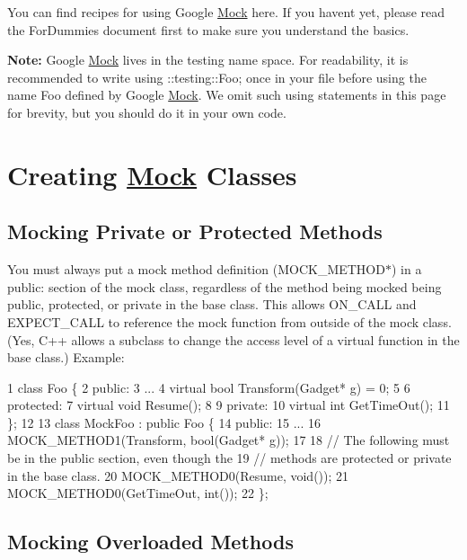 You can find recipes for using Google \hyperlink{class_mock}{Mock} here. If you haven\textquotesingle{}t yet, please read the For\+Dummies document first to make sure you understand the basics.

{\bfseries Note\+:} Google \hyperlink{class_mock}{Mock} lives in the {\ttfamily testing} name space. For readability, it is recommended to write {\ttfamily using \+::testing\+::\+Foo;} once in your file before using the name {\ttfamily Foo} defined by Google \hyperlink{class_mock}{Mock}. We omit such {\ttfamily using} statements in this page for brevity, but you should do it in your own code.

\section*{Creating \hyperlink{class_mock}{Mock} Classes}

\subsection*{Mocking Private or Protected Methods}

You must always put a mock method definition ({\ttfamily M\+O\+C\+K\+\_\+\+M\+E\+T\+H\+O\+D$\ast$}) in a {\ttfamily public\+:} section of the mock class, regardless of the method being mocked being {\ttfamily public}, {\ttfamily protected}, or {\ttfamily private} in the base class. This allows {\ttfamily O\+N\+\_\+\+C\+A\+LL} and {\ttfamily E\+X\+P\+E\+C\+T\+\_\+\+C\+A\+LL} to reference the mock function from outside of the mock class. (Yes, C++ allows a subclass to change the access level of a virtual function in the base class.) Example\+:


\begin{DoxyCode}
1 class Foo \{
2  public:
3   ...
4   virtual bool Transform(Gadget* g) = 0;
5 
6  protected:
7   virtual void Resume();
8 
9  private:
10   virtual int GetTimeOut();
11 \};
12 
13 class MockFoo : public Foo \{
14  public:
15   ...
16   MOCK\_METHOD1(Transform, bool(Gadget* g));
17 
18   // The following must be in the public section, even though the
19   // methods are protected or private in the base class.
20   MOCK\_METHOD0(Resume, void());
21   MOCK\_METHOD0(GetTimeOut, int());
22 \};
\end{DoxyCode}


\subsection*{Mocking Overloaded Methods}

